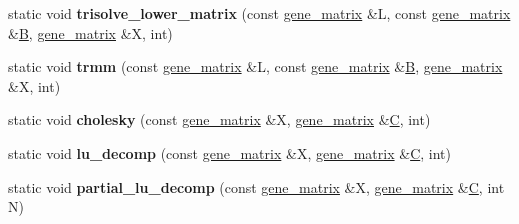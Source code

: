 \begin{DoxyCompactItemize}
\item 
\mbox{\label{classeigen3__interface_a9269dd9282029b9c78ff2dc4c200e179}} 
static void {\bfseries trisolve\+\_\+lower\+\_\+matrix} (const \hyperlink{group___core___module_class_eigen_1_1_matrix}{gene\+\_\+matrix} \&L, const \hyperlink{group___core___module_class_eigen_1_1_matrix}{gene\+\_\+matrix} \&\hyperlink{group___core___module_class_eigen_1_1_matrix}{B}, \hyperlink{group___core___module_class_eigen_1_1_matrix}{gene\+\_\+matrix} \&X, int)
\item 
\mbox{\label{classeigen3__interface_adc120fbc410c139277c955f0da3e4c1b}} 
static void {\bfseries trmm} (const \hyperlink{group___core___module_class_eigen_1_1_matrix}{gene\+\_\+matrix} \&L, const \hyperlink{group___core___module_class_eigen_1_1_matrix}{gene\+\_\+matrix} \&\hyperlink{group___core___module_class_eigen_1_1_matrix}{B}, \hyperlink{group___core___module_class_eigen_1_1_matrix}{gene\+\_\+matrix} \&X, int)
\item 
\mbox{\label{classeigen3__interface_a6102457cfad48d50f019c7c95bc0b43d}} 
static void {\bfseries cholesky} (const \hyperlink{group___core___module_class_eigen_1_1_matrix}{gene\+\_\+matrix} \&X, \hyperlink{group___core___module_class_eigen_1_1_matrix}{gene\+\_\+matrix} \&\hyperlink{group___core___module}{C}, int)
\item 
\mbox{\label{classeigen3__interface_a606d44542d7882e4e8f895098eaf6f23}} 
static void {\bfseries lu\+\_\+decomp} (const \hyperlink{group___core___module_class_eigen_1_1_matrix}{gene\+\_\+matrix} \&X, \hyperlink{group___core___module_class_eigen_1_1_matrix}{gene\+\_\+matrix} \&\hyperlink{group___core___module}{C}, int)
\item 
\mbox{\label{classeigen3__interface_add6ceaf00965b00fc42a8e8d19c2245f}} 
static void {\bfseries partial\+\_\+lu\+\_\+decomp} (const \hyperlink{group___core___module_class_eigen_1_1_matrix}{gene\+\_\+matrix} \&X, \hyperlink{group___core___module_class_eigen_1_1_matrix}{gene\+\_\+matrix} \&\hyperlink{group___core___module}{C}, int N)
\item 
\mbox{\label{classeigen3__interface_a2690bb3d88fe13e22b5e252aab69bfe0}} 

\end{DoxyCompactItemize}
